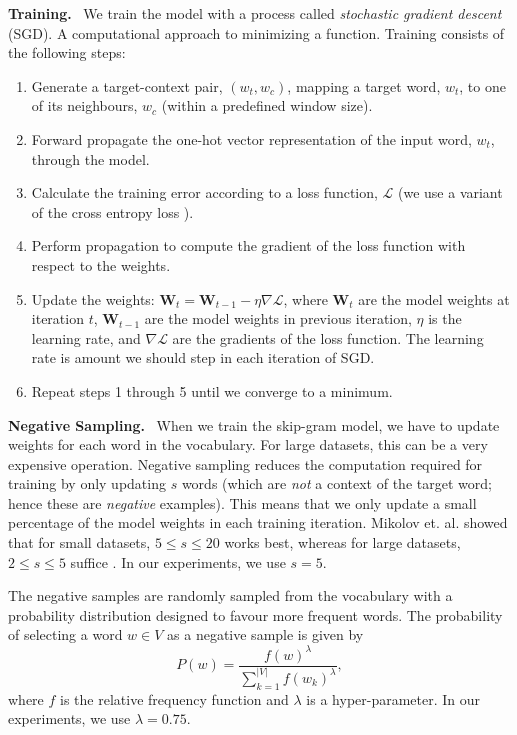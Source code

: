 \documentclass{paper}
\newcommand{\mat}[1]{\bm{#1}}
\newcommand{\inlineSection}[1]{\vspace{0.5em}\noindent\textbf{#1.}~}
\begin{document}
\inlineSection{Training} We train the model with a process called \textit{stochastic gradient descent} (SGD). A computational approach to minimizing a function. Training consists of the following steps:
\begin{enumerate}
    \item Generate a target-context pair, $(w_t, w_c)$, mapping a target word, $w_t$, to one of its neighbours, $w_c$ (within a predefined window size). 
    \item Forward propagate the one-hot vector representation of the input word, $w_t$, through the model.
    \item Calculate the training error according to a loss function, $\mathcal{L}$ (we use a variant of the cross entropy loss \cite{mikolov2013efficient, goldberg2014word2vec}).
    \item Perform propagation to compute the gradient of the loss function with respect to the weights.
    \item Update the weights: $\mat{W}_t=\mat{W}_{t-1}-\eta\nabla\mathcal{L}$, where $\mat{W}_t$ are the model weights at iteration $t$, $\mat{W}_{t-1}$ are the model weights in previous iteration, $\eta$ is the learning rate, and $\nabla\mathcal{L}$ are the gradients of the loss function. The learning rate is amount we should step in each iteration of SGD.
    \item Repeat steps 1 through 5 until we converge to a minimum.
\end{enumerate}

\inlineSection{Negative Sampling} When we train the skip-gram model, we have to update weights for each word in the vocabulary. For large datasets, this can be a very expensive operation. Negative sampling reduces the computation required for training by only updating $s$ words (which are \textit{not} a context of the target word; hence these are \textit{negative} examples). This means that we only update a small percentage of the model weights in each training iteration. Mikolov et. al. showed that for small datasets, $5\leq s\leq 20$ works best, whereas for large datasets, $2\leq s\leq 5$ suffice \cite{mikolov2013efficient}. In our experiments, we use $s=5$.

The negative samples are randomly sampled from the vocabulary with a probability distribution designed to favour more frequent words. The probability of selecting a word $w\in V$ as a negative sample is given by
\begin{equation}
    \label{eq:word2vec_neg_sample_distribution}
    P(w)=\frac{f(w)^\lambda}{\sum_{k=1}^{|V|}f(w_k)^\lambda},
\end{equation}
where $f$ is the relative frequency function and $\lambda$ is a hyper-parameter. In our experiments, we use $\lambda = 0.75$.
\end{document}
